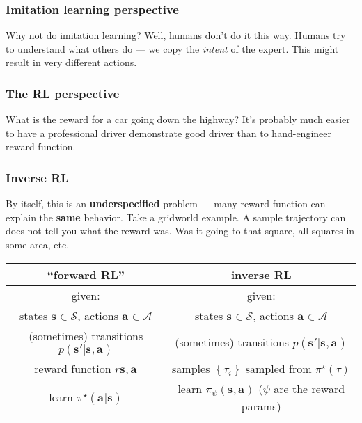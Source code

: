 \documentclass{report}
\begin{document}
\subsubsection{Imitation learning perspective}
Why not do imitation learning? Well, humans don't do it this way.
Humans try to understand what others do --- we copy the \textit{intent} of the expert.
This might result in very different actions.

\subsubsection{The RL perspective}
What is the reward for a car going down the highway? It's probably much easier
to have a professional driver demonstrate good driver than to hand-engineer reward function.

\subsubsection{Inverse RL}
By itself, this is an \textbf{underspecified} problem --- many reward function can explain the \textbf{same} behavior.
Take a gridworld example. A sample trajectory can does not tell you what the reward was. Was it going to that square, 
all squares in some area, etc.

\begin{table}[htpb]
		\centering
		\begin{tabular}{c | c}
				\textbf{``forward RL''} & \textbf{inverse RL} \\
				\hline
				given: &  given: \\
				states $ \bm{s}_{} \in \mathcal{S}  $, actions $ \bm{a}_{} \in \mathcal{A}  $ &
				states $ \bm{s}_{} \in \mathcal{S}  $, actions $ \bm{a}_{} \in \mathcal{A}  $ \\
				(sometimes) transitions $ p (\bm{s}_{}'|\bm{s}_{}, \bm{a}_{} )  $ &
				(sometimes) transitions $ p (\bm{s}_{}'|\bm{s}_{}, \bm{a}_{} )  $\\
				reward function $ r \bm{s}_{}, \bm{a}_{}   $ &
				samples $ \left\{ \tau_{ i } \right\}   $ sampled from $ \pi^{ \star } (\tau)  $ \\
				learn $ \pi^{ \star } (\bm{a}_{}| \bm{s}_{} )  $&
				learn $ \pi_{ \psi } (\bm{s}_{}, \bm{a}_{} )  $ ($\psi$ are the reward params)\\
				\hline
		\end{tabular}
\end{table}
\end{document}
